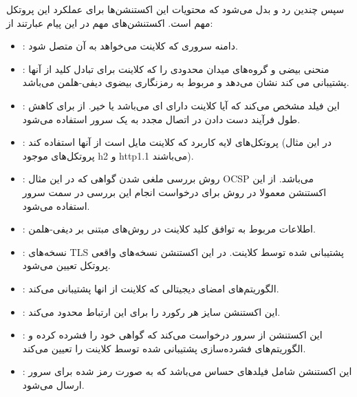 \documentclass{report}
\begin{document}
سپس چندین  رد و بدل می‌شود که محتویات این اکستنشن‌ها برای عملکرد این پروتکل مهم است. اکستنشن‌های مهم در این پیام عبارتند از:
\begin{itemize}

\item {}:
دامنه سروری که کلاینت می‌خواهد به آن متصل شود.

\item {}:
منحنی بیضی و گروه‌های میدان محدودی را که کلاینت برای تبادل کلید از آنها پشتیبانی می کند نشان می‌دهد و مربوط به رمزنگاری بیضوی دیفی-هلمن می‌باشد.

\item {}:
این فیلد مشخص می‌کند که آیا کلاینت دارای  ای می‌باشد یا خیر. از  برای کاهش طول فرآیند دست دادن در اتصال مجدد به یک سرور استفاده می‌شود.

\item {}:
پروتکل‌های لایه کاربرد که کلاینت مایل است از آنها استفاده کند (در این مثال پروتکل‌های موجود h2 و http1.1 می‌باشند).

\item {}:
روش بررسی ملغی شدن گواهی که در این مثال OCSP می‌باشد. از این اکستنشن معمولا در روش  برای درخواست انجام این بررسی در سمت سرور استفاده می‌شود.

\item {}:
اطلاعات مربوط به توافق کلید کلاینت در روش‌های مبتنی بر دیفی-هلمن.

\item {}:
نسخه‌های TLS پشتیبانی شده توسط کلاینت. در این اکستنشن نسخه‌های واقعی پروتکل تعیین می‌شود.

\item {}:
الگوریتم‌های امضای دیجیتالی که کلاینت از انها پشتیبانی می‌کند.

\item {}:
این اکستنشن سایز هر رکورد را برای این ارتباط محدود می‌کند.

\item {}:
این اکستنشن از سرور درخواست می‌کند که گواهی خود را فشرده کرده و الگوریتم‌های فشرده‌سازی پشتیبانی شده توسط کلاینت را تعیین می‌کند.

\item {}:
این اکستنشن شامل فیلدهای حساس  می‌باشد که به صورت رمز شده برای سرور ارسال می‌شود.

\end{itemize}
\end{document}
